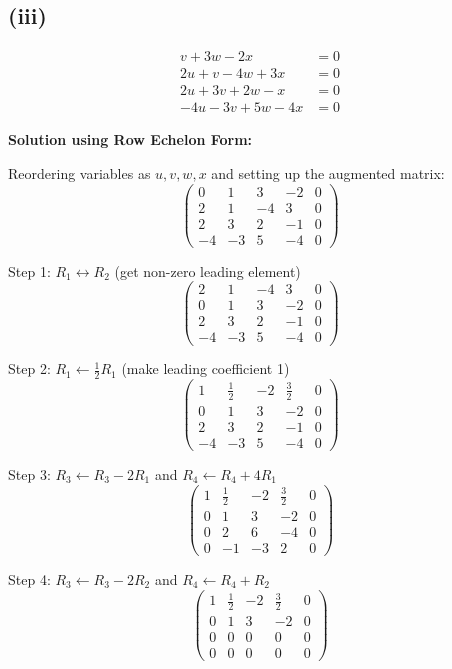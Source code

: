 \subsection*{(iii)}
\begin{align*}
v + 3w - 2x &= 0\\
2u + v - 4w + 3x &= 0\\
2u + 3v + 2w - x &= 0\\
-4u - 3v + 5w - 4x &= 0
\end{align*}

\textbf{Solution using Row Echelon Form:}

Reordering variables as $u, v, w, x$ and setting up the augmented matrix:
\[
\left(\begin{array}{cccc|c}
0 & 1 & 3 & -2 & 0\\
2 & 1 & -4 & 3 & 0\\
2 & 3 & 2 & -1 & 0\\
-4 & -3 & 5 & -4 & 0
\end{array}\right)
\]

Step 1: $R_1 \leftrightarrow R_2$ (get non-zero leading element)
\[
\left(\begin{array}{cccc|c}
2 & 1 & -4 & 3 & 0\\
0 & 1 & 3 & -2 & 0\\
2 & 3 & 2 & -1 & 0\\
-4 & -3 & 5 & -4 & 0
\end{array}\right)
\]

Step 2: $R_1 \leftarrow \frac{1}{2}R_1$ (make leading coefficient 1)
\[
\left(\begin{array}{cccc|c}
1 & \frac{1}{2} & -2 & \frac{3}{2} & 0\\
0 & 1 & 3 & -2 & 0\\
2 & 3 & 2 & -1 & 0\\
-4 & -3 & 5 & -4 & 0
\end{array}\right)
\]

Step 3: $R_3 \leftarrow R_3 - 2R_1$ and $R_4 \leftarrow R_4 + 4R_1$
\[
\left(\begin{array}{cccc|c}
1 & \frac{1}{2} & -2 & \frac{3}{2} & 0\\
0 & 1 & 3 & -2 & 0\\
0 & 2 & 6 & -4 & 0\\
0 & -1 & -3 & 2 & 0
\end{array}\right)
\]

Step 4: $R_3 \leftarrow R_3 - 2R_2$ and $R_4 \leftarrow R_4 + R_2$
\[
\left(\begin{array}{cccc|c}
1 & \frac{1}{2} & -2 & \frac{3}{2} & 0\\
0 & 1 & 3 & -2 & 0\\
0 & 0 & 0 & 0 & 0\\
0 & 0 & 0 & 0 & 0
\end{array}\right)
\]

